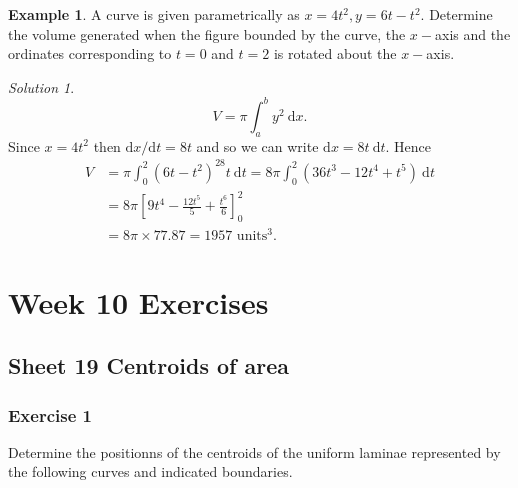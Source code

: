 \documentclass[
  11pt,
  oneside]{book}
\newcommand{\slide}{}
\theoremstyle{definition}
\theoremstyle{definition}
\newtheorem{example}{Example}[chapter]
\theoremstyle{definition}
\theoremstyle{definition}
\theoremstyle{remark}
\newtheorem*{solution}{Solution}
\begin{document}
\begin{slidesonly}

\slide

\hbox{}
\slide

\end{slidesonly}

\begin{example}
A curve is given parametrically as \(x=4t^2, y = 6t-t^2\). Determine the volume generated when the figure bounded by the curve, the \(x-\)axis and the ordinates corresponding to \(t=0\) and \(t=2\) is rotated about the \(x-\)axis.
\end{example}

\begin{solution}
\[
V = \pi\int_a^b y^2\ \mathrm{d}x.
\]
Since \(x=4t^2\) then \(\mathrm{d}x/\mathrm{d}t = 8t\) and so we can write \(\mathrm{d}x = 8t\ \mathrm{d}t\). Hence
\begin{align*}
V& = \pi\int_0^2(6t-t^2)^28t\ \mathrm{d}t = 8\pi\int_0^2(36t^3-12t^4+t^5)\ \mathrm{d}t\\
& = 8\pi\left[9t^4-\frac{12t^5}5+\frac{t^6}6\right]_0^2\\
&= 8\pi\times77.87 = 1957 \text{ units}^3.
\end{align*}
\end{solution}

\begin{slidesonly}

\slide

\hbox{}
\slide

\end{slidesonly}

\chapter*{Week 10 Exercises}\label{week-10-exercises}

\section{Sheet 19 Centroids of area}\label{sheet-19-centroids-of-area}

\slide

\subsection*{Exercise 1}\label{exercise-1-10}

Determine the positionns of the centroids of the uniform laminae represented by the following curves and indicated boundaries.
\end{document}
